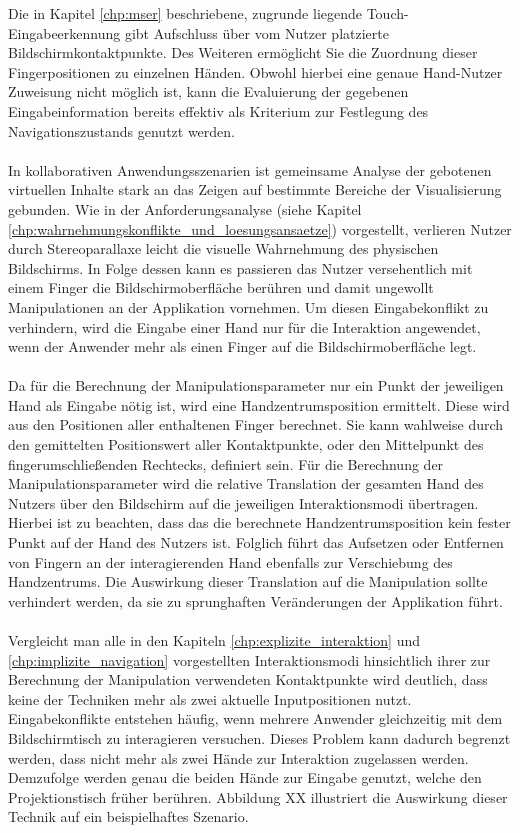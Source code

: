 Die in Kapitel \ref{chp:mser} beschriebene, zugrunde liegende Touch-Eingabeerkennung gibt Aufschluss über vom Nutzer platzierte Bildschirmkontaktpunkte. Des Weiteren ermöglicht Sie die Zuordnung dieser Fingerpositionen zu einzelnen Händen. Obwohl hierbei eine genaue Hand-Nutzer Zuweisung nicht möglich ist, kann die Evaluierung der gegebenen Eingabeinformation bereits effektiv als Kriterium zur Festlegung des Navigationszustands genutzt werden.
\\\\
In kollaborativen Anwendungsszenarien ist gemeinsame Analyse der gebotenen virtuellen Inhalte stark an das Zeigen auf bestimmte Bereiche der Visualisierung gebunden. Wie in der Anforderungsanalyse (siehe Kapitel \ref{chp:wahrnehmungskonflikte_und_loesungsansaetze}) vorgestellt, verlieren Nutzer durch Stereoparallaxe leicht die visuelle Wahrnehmung des physischen Bildschirms. In Folge dessen kann es passieren das Nutzer versehentlich mit einem Finger die Bildschirmoberfläche berühren und damit ungewollt Manipulationen an der Applikation vornehmen. Um diesen Eingabekonflikt zu verhindern, wird die Eingabe einer Hand nur für die Interaktion angewendet, wenn der Anwender mehr als einen Finger auf die Bildschirmoberfläche legt. 
\\\\
Da für die Berechnung der Manipulationsparameter nur ein Punkt der jeweiligen Hand als Eingabe nötig ist, wird eine Handzentrumsposition ermittelt. Diese wird aus den Positionen aller enthaltenen Finger berechnet. Sie kann wahlweise durch den gemittelten Positionswert aller Kontaktpunkte, oder den Mittelpunkt des fingerumschließenden Rechtecks, definiert sein. Für die Berechnung der Manipulationsparameter wird die relative Translation der gesamten Hand des Nutzers über den Bildschirm auf die jeweiligen Interaktionsmodi übertragen. Hierbei ist zu beachten, dass das die berechnete Handzentrumsposition kein fester Punkt auf der Hand des Nutzers ist. Folglich führt das Aufsetzen oder Entfernen von Fingern an der interagierenden Hand ebenfalls zur Verschiebung des Handzentrums. Die Auswirkung dieser Translation auf die Manipulation sollte verhindert werden, da sie zu sprunghaften Veränderungen der Applikation führt.
\\\\
Vergleicht man alle in den Kapiteln \ref{chp:explizite_interaktion} und \ref{chp:implizite_navigation} vorgestellten Interaktionsmodi hinsichtlich ihrer zur Berechnung der Manipulation verwendeten Kontaktpunkte wird deutlich, dass keine der Techniken mehr als zwei aktuelle Inputpositionen nutzt. Eingabekonflikte entstehen häufig, wenn mehrere Anwender gleichzeitig mit dem Bildschirmtisch zu interagieren versuchen. Dieses Problem kann dadurch begrenzt werden, dass nicht mehr als zwei Hände zur Interaktion zugelassen werden. Demzufolge werden genau die beiden Hände zur Eingabe genutzt, welche den Projektionstisch früher berühren. Abbildung XX illustriert die Auswirkung dieser Technik auf ein beispielhaftes Szenario.
